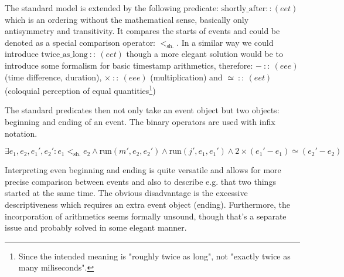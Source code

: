 \documentclass{article}
\renewcommand\t[1]{\text{#1}}
\begin{document}
The standard model is extended by the following predicate: $\t{shortly\_after} :: (eet)$ which is an ordering without the mathematical sense, basically only antisymmetry and transitivity. It compares the starts of events and could be denoted as a special comparison operator: $<_\t{sh.}$. In a similar way we could introduce $\t{twice\_as\_long}\ ::\ (eet)$ though a more elegant solution would be to introduce some formalism for basic timestamp arithmetics, therefore: $-\ ::\ (eee)$ (time difference, duration), $\times\ ::\ (eee)$ (multiplication) and $\simeq\ ::\ (eet)$ (coloquial perception of equal quantities\footnote{Since the intended meaning is "roughly twice as long", not "exactly twice as many miliseconds".}) 

The standard predicates then not only take an event object but two objects: beginning and ending of an event. The binary operators are used with infix notation.

$$
\exists e_1, e_2,e_1',e_2': e_1 <_\t{sh.} e_2 \wedge \t{run}(m',e_2,e_2') \wedge \t{run}(j',e_1,e_1') \wedge 2\times (e_1'-e_1) \simeq (e_2'-e_2)
$$

Interpreting even beginning and ending is quite versatile and allows for more precise comparison between events and also to describe e.g. that two things started at the same time.
The obvious disadvantage is the excessive descriptiveness which requires an extra event object (ending). Furthermore, the incorporation of arithmetics seems formally unsound, though that's a separate issue and probably solved in some elegant manner.
\end{document}
